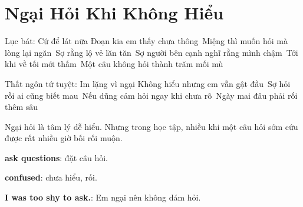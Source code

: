 \chapter{Ngại Hỏi Khi Không Hiểu}

\begin{lucbatbox}{Lục bát: Cứ để lát nữa}
Đoạn kia em thấy chưa thông\
Miệng thì muốn hỏi mà lòng lại ngăn\
Sợ rằng lộ vẻ lăn tăn\
Sợ người bên cạnh nghĩ rằng mình chậm\
Tới khi về tối mới thấm\
Một câu không hỏi thành trăm mối mù
\end{lucbatbox}

\begin{tutuyetbox}{Thất ngôn tứ tuyệt: Im lặng vì ngại}
Không hiểu nhưng em vẫn gật đầu\
Sợ hỏi rồi ai cũng biết mau\
Nếu dũng cảm hỏi ngay khi chưa rõ\
Ngày mai đâu phải rối thêm sâu
\end{tutuyetbox}

\begin{ghichu}
Ngại hỏi là tâm lý dễ hiểu. Nhưng trong học tập, nhiều khi một câu hỏi sớm cứu được rất nhiều giờ bối rối muộn.
\end{ghichu}

\begin{englishnote}
\textbf{ask questions}: đặt câu hỏi.\par
\textbf{confused}: chưa hiểu, rối.\par
\textbf{I was too shy to ask.}: Em ngại nên không dám hỏi.
\end{englishnote}